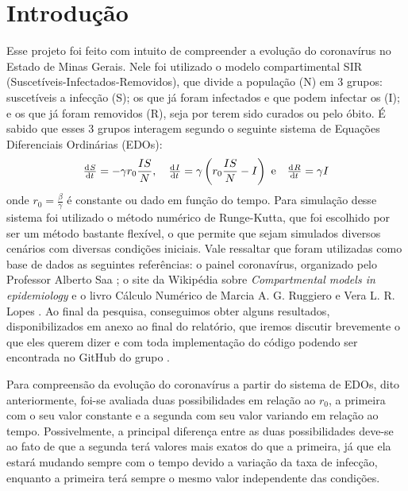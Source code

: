 \documentclass[11pt, a4paper]{article}
\begin{document}


\section*{Introdução}
Esse projeto foi feito com intuito de compreender a evolução do coronavírus no Estado de Minas Gerais.
Nele foi utilizado o modelo compartimental SIR (Suscetíveis-Infectados-Removidos), que divide a população (N) em 3 grupos: suscetíveis a infecção (S); os que já foram infectados e que podem infectar os  (I); e os que já foram removidos (R), seja por terem sido curados ou pelo óbito. 
É sabido que esses 3 grupos interagem segundo o seguinte sistema de Equações Diferenciais Ordinárias (EDOs):
\[
	\od{S}{t} = - \gamma r_0 \frac{IS}{N} , \quad
	\od{I}{t} = \gamma \left( r_0 \frac{IS}{N} - I \right) \text{ e} \quad
	\od{R}{t} = \gamma I
\]
onde $r_0 = \frac{\beta}{\gamma}$ é constante ou dado em função do tempo. 
Para simulação desse sistema foi utilizado o método numérico de Runge-Kutta, que foi escolhido por ser um método bastante flexível, o que permite que sejam simulados  diversos cenários com diversas condições iniciais.
Vale ressaltar que foram utilizadas como base de dados as seguintes referências:
o painel coronavírus, organizado pelo Professor Alberto Saa \cite{painel_covid};
o site da Wikipédia sobre \emph{Compartmental models in epidemiology} \cite{model}
e o livro Cálculo Numérico de Marcia A. G. Ruggiero e Vera L. R. Lopes \cite{calc_num}.
Ao final da pesquisa, conseguimos obter alguns resultados, disponibilizados em anexo ao final do relatório, que iremos discutir brevemente o que eles querem dizer e com toda implementação do código podendo ser encontrada no GitHub do grupo \cite{git_grupo}.

Para compreensão da evolução do coronavírus a partir do sistema de EDOs, dito anteriormente, foi-se avaliada duas possibilidades em relação ao $r_0$, a primeira com o seu valor constante e a segunda com seu valor variando em relação ao tempo.
Possivelmente, a principal diferença entre as duas possibilidades deve-se ao fato de que a segunda terá valores mais exatos do que a primeira, já que ela estará mudando sempre com o tempo devido a variação da taxa de infecção, enquanto a primeira terá sempre o mesmo valor independente das condições.
\end{document}
